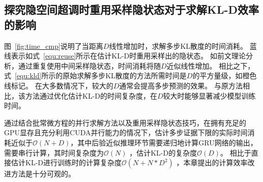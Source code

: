 \subsection{探究隐空间超调时重用采样隐状态对于求解KL-D效率的影响}
图~\ref{fig:time_cmp}说明了当距离$D$线性增加时，求解多步KL散度的时间消耗。
蓝线表示如式~\eqref{equ:reuse}所示在估计KL-D时重用采样出的隐状态。
如前文理论分析，通过重复使用中间采样隐状态，时间消耗将随$D$近似线性增加。
相比之下，式~\eqref{equ:kld}所示的原始求解多步KL散度的方法所需时间是$D$的平方量级，如橙色线标记。
在大多数情况下，较大的$D$通常会提高多步预测的效果。
与原方法相比，该方法通过优化估计KL-D的时间复杂度，在$D$较大时能够显著减少模型训练时间。

通过结合批常微方程的并行求解方法以及重用采样隐状态技巧，在拥有充足的GPU显存且充分利用CUDA并行能力的情况下，估计多步证据下限的实际时间消耗近似于$\mathcal{O}(N+D)$，其中后验近似推理环节需要递归地计算GRU网络的输出，需要串行计算，其时间复杂度为$\mathcal{O}(N)$ ，估计KL-D的复杂度$\mathcal{O}(D)$。
相比于直接估计KL-D进行训练时的计算复杂度$\mathcal{O}(N+N*D^2)$
，本章提出的计算效率改进方法是十分可观的。

